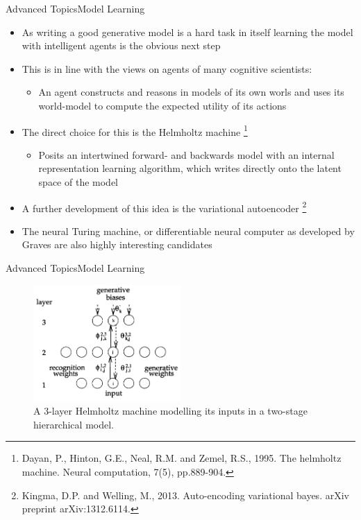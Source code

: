 \documentclass[AERbeamer%
              ,optEnglish%
              ,optBiber%
              ,optBibstyleAlphabetic%
              ,optBeamerClassicFormat%
              ]{AERlatex}%
\begin{document}
\begin{frame}[c]{Advanced Topics}{Model Learning}
    \centering
    \begin{itemize}
        \item As writing a good generative model is a hard task in itself learning the model with intelligent
              agents is the obvious next step
        \item This is in line with the views on agents of many cognitive scientists:
        \begin{itemize}
            \item An agent constructs and reasons in models of its own worls and uses its world-model to
                  compute the expected utility of its actions
        \end{itemize}
        \item The direct choice for this is the Helmholtz machine \footnote{Dayan, P., Hinton, G.E., Neal, R.M. and Zemel, R.S., 1995. The helmholtz machine. Neural computation, 7(5), pp.889-904.}
        \begin{itemize}
            \item Posits an intertwined forward- and backwards model with an internal representation learning algorithm, which writes directly onto the latent space of the model
        \end{itemize}
        \item A further development of this idea is the variational autoencoder \footnote{Kingma, D.P. and Welling, M., 2013. Auto-encoding variational bayes. arXiv preprint arXiv:1312.6114.}
        \item The neural Turing machine, or differentiable neural computer as developed by Graves are also highly interesting candidates
    \end{itemize}
\end{frame}


\begin{frame}[c]{Advanced Topics}{Model Learning}
    \centering
    \begin{figure}
        \centering
        \includegraphics[width=0.5\textwidth]{3LayerHelmholtzMachine.png}
        \caption{A 3-layer Helmholtz machine modelling its inputs in a two-stage hierarchical model.}
    \end{figure}
\end{frame}
\end{document}
